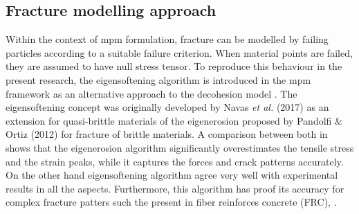 \message{ !name(2020_EFM_MPM_Eigensoftening.tex)}\documentclass[preprint,12pt,a4paper]{elsarticle}
\begin{document}
\subsection{Fracture modelling approach}
\label{sec:2.3}
Within the context of \acrshort{mpm} formulation, fracture can be
modelled by failing particles according to a suitable failure
criterion. When material points are failed, they are assumed to have
null stress tensor. To reproduce this behaviour in the present
research, the eigensoftening algorithm is introduced in the 
\acrshort{mpm} framework as an alternative approach to the decohesion
model \cite{Zhenmao_2005,Schreyer_2002}. The eigensoftening concept
was originally developed by Navas {\it et al.}
(2017)\cite{Navas_2017_ES} as an extension for quasi-brittle materials
of the eigenerosion proposed by Pandolfi \& Ortiz
(2012)\cite{Pandolfi_2012} for fracture of brittle materials. A
comparison between both in \cite{Navas_2017_ES} shows that the
eigenerosion algorithm significantly overestimates the tensile  
stress and the strain peaks, while it captures the forces and crack
patterns accurately. On the other hand eigensoftening algorithm agree
very well with experimental results in all the aspects. Furthermore,
this algorithm has proof its accuracy for complex fracture
patters such the present in fiber reinforces concrete (FRC),
\cite{Navas_2018_ES}.\\
\end{document}
